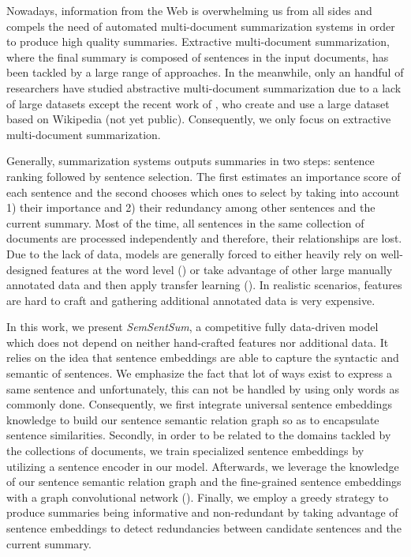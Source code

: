 \documentclass{article}
\begin{document}
Nowadays, information from the Web is overwhelming us from all sides and compels the need of automated multi-document summarization systems in order to produce high quality summaries. Extractive multi-document summarization, where the final summary is composed of sentences in the input documents, has been tackled by a large range of approaches. In the meanwhile, only an handful of researchers have studied abstractive multi-document summarization due to a lack of large datasets except the recent work of \citet{wiki2018}, who create and use a large dataset based on Wikipedia (not yet public). Consequently, we only focus on extractive multi-document summarization.

Generally, summarization systems outputs summaries in two steps: sentence ranking followed by sentence selection. The first estimates an importance score of each sentence and the second chooses which ones to select by taking into account 1) their importance and 2) their redundancy among other sentences and the current summary. Most of the time, all sentences in the same collection of documents are processed independently and therefore, their relationships are lost. Due to the lack of data, models are generally forced to either heavily rely on well-designed features at the word level (\citet{hong2014improving, cao2015ranking, christensen2013towards}) or take advantage of other large manually annotated data and then apply transfer learning (\citet{CaoLLW17}). In realistic scenarios, features are hard to craft and gathering additional annotated data is very expensive.

In this work, we present \textit{SemSentSum}, a competitive fully data-driven model which does not depend on neither hand-crafted features nor additional data. It relies on the idea that sentence embeddings are able to capture the syntactic and semantic of sentences. We emphasize the fact that lot of ways exist to express a same sentence and unfortunately, this can not be handled by using only words as commonly done. Consequently, we first integrate universal sentence embeddings knowledge to build our sentence semantic relation graph so as to encapsulate sentence similarities. %
Secondly, in order to be related to the domains tackled by the collections of documents, we train specialized sentence embeddings by utilizing a sentence encoder in our model. Afterwards, we leverage the knowledge of our sentence semantic relation graph and the fine-grained sentence embeddings with a graph convolutional network (\citet{KipfW16}). %
Finally, we employ a greedy strategy to produce summaries being informative and non-redundant by taking advantage of sentence embeddings to detect redundancies between candidate sentences and the current summary.
\end{document}
